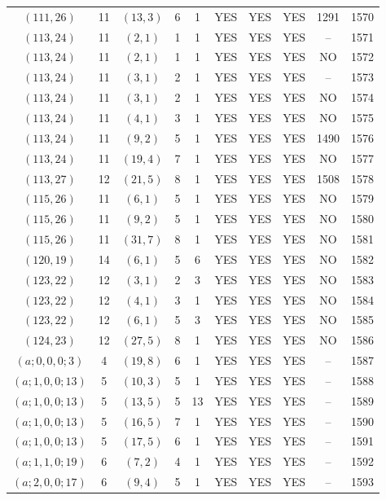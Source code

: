 \begin{longtable}{|c|c|c|c|c|c|c|c|c|c|}
$(111, 26)$ & 11 & $(13, 3)$ & 6 & 1 & YES & YES & YES & 1291 & 1570\\
$(113, 24)$ & 11 & $(2, 1)$ & 1 & 1 & YES & YES & YES & -- & 1571\\
$(113, 24)$ & 11 & $(2, 1)$ & 1 & 1 & YES & YES & YES & NO & 1572\\
$(113, 24)$ & 11 & $(3, 1)$ & 2 & 1 & YES & YES & YES & -- & 1573\\
$(113, 24)$ & 11 & $(3, 1)$ & 2 & 1 & YES & YES & YES & NO & 1574\\
$(113, 24)$ & 11 & $(4, 1)$ & 3 & 1 & YES & YES & YES & NO & 1575\\
$(113, 24)$ & 11 & $(9, 2)$ & 5 & 1 & YES & YES & YES & 1490 & 1576\\
$(113, 24)$ & 11 & $(19, 4)$ & 7 & 1 & YES & YES & YES & NO & 1577\\
$(113, 27)$ & 12 & $(21, 5)$ & 8 & 1 & YES & YES & YES & 1508 & 1578\\
$(115, 26)$ & 11 & $(6, 1)$ & 5 & 1 & YES & YES & YES & NO & 1579\\
$(115, 26)$ & 11 & $(9, 2)$ & 5 & 1 & YES & YES & YES & NO & 1580\\
$(115, 26)$ & 11 & $(31, 7)$ & 8 & 1 & YES & YES & YES & NO & 1581\\
$(120, 19)$ & 14 & $(6, 1)$ & 5 & 6 & YES & YES & YES & NO & 1582\\
$(123, 22)$ & 12 & $(3, 1)$ & 2 & 3 & YES & YES & YES & NO & 1583\\
$(123, 22)$ & 12 & $(4, 1)$ & 3 & 1 & YES & YES & YES & NO & 1584\\
$(123, 22)$ & 12 & $(6, 1)$ & 5 & 3 & YES & YES & YES & NO & 1585\\
$(124, 23)$ & 12 & $(27, 5)$ & 8 & 1 & YES & YES & YES & NO & 1586\\
$(a; 0, 0, 0; 3)$ & 4 & $(19, 8)$ & 6 & 1 & YES & YES & YES & -- & 1587\\
$(a; 1, 0, 0; 13)$ & 5 & $(10, 3)$ & 5 & 1 & YES & YES & YES & -- & 1588\\
$(a; 1, 0, 0; 13)$ & 5 & $(13, 5)$ & 5 & 13 & YES & YES & YES & -- & 1589\\
$(a; 1, 0, 0; 13)$ & 5 & $(16, 5)$ & 7 & 1 & YES & YES & YES & -- & 1590\\
$(a; 1, 0, 0; 13)$ & 5 & $(17, 5)$ & 6 & 1 & YES & YES & YES & -- & 1591\\
$(a; 1, 1, 0; 19)$ & 6 & $(7, 2)$ & 4 & 1 & YES & YES & YES & -- & 1592\\
$(a; 2, 0, 0; 17)$ & 6 & $(9, 4)$ & 5 & 1 & YES & YES & YES & -- & 1593\\

\end{longtable}
